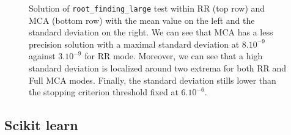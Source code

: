 \documentclass[11pt]{article}
\begin{document}
\begin{figure}
\begin{subfigure}{0.45\linewidth}
    \label{fig:my_label}
    \end{subfigure}
    \caption{Solution of \texttt{root\_finding\_large} test within RR (top row) and MCA (bottom row) with the mean value on the left and the standard deviation on the right. We can see that MCA has a less precision solution with a maximal standard deviation at $8.10^{-9}$ against $3.10^{-9}$ for RR mode. Moreover, we can see that a high standard deviation is localized around two extrema for both RR and Full MCA modes. Finally, the standard deviation stills lower than
    the stopping criterion threshold fixed at $6.10^{-6}$.}
    \label{fig:root_finding_large}
\end{figure}



\subsection{Scikit learn}
\label{sec:sklearn_tests}
\end{document}
